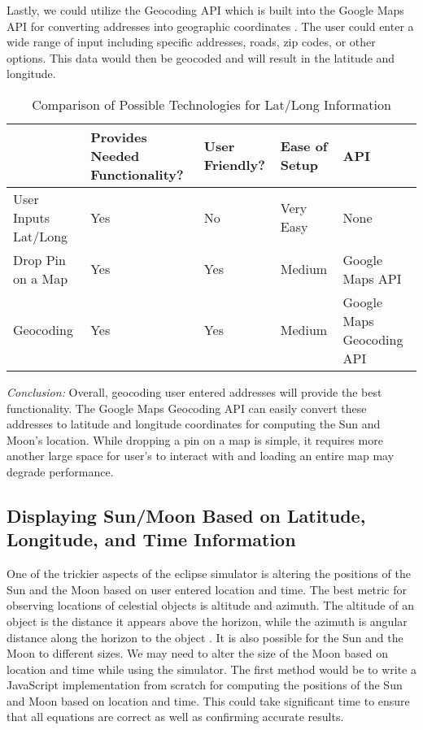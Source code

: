 \documentclass[10pt, onecolumn, draftclsnofoot, letterpaper, compsoc]{IEEEtran}
\begin{document}
Lastly, we could utilize the Geocoding API which is built into the Google Maps
API for converting addresses into geographic coordinates \cite{jsGEO}.
The user could enter a wide range of input including specific addresses,
roads, zip codes, or other options. This data would then be geocoded and will
result in the latitude and longitude.

\begin{table}[h]
\centering
\caption{Comparison of Possible Technologies for Lat/Long Information}
\begin{tabular}{|p{3.15cm}|p{3.15cm}|p{3.15cm}|p{3.15cm}|p{3.15cm}|}
\cline{5-4}

\hline  & Provides Needed Functionality? & User Friendly? & Ease of Setup
 & API \\ \hline

User Inputs Lat/Long & Yes & No & Very Easy & None \\ \hline

Drop Pin on a Map & Yes & Yes & Medium & Google Maps API \\ \hline

Geocoding & Yes & Yes & Medium & Google Maps Geocoding API \\ \hline

\end{tabular}
\label{table:Jake2}
\end{table}

\textit{Conclusion:} Overall, geocoding user entered addresses will provide the
best functionality. The Google Maps Geocoding API can easily convert these
addresses to latitude and longitude coordinates for computing the Sun and
Moon's location. While dropping a pin on a map is simple, it requires more
another large space for user’s to interact with and loading an entire
map may degrade performance.

\subsection{Displaying Sun/Moon Based on Latitude, Longitude, and Time
 Information}

One of the trickier aspects of the eclipse simulator is altering the positions
of the Sun and the Moon based on user entered location and time. The best metric
for observing locations of celestial objects is altitude and azimuth. The
altitude of an object is the distance it appears above the horizon, while the
azimuth is angular distance along the horizon to the object \cite{ALTAZI}.
It is also possible for the Sun and the Moon to different sizes. We may need
to alter the size of the Moon based on location and time while using the
simulator. The first method would be to write a JavaScript implementation
from scratch for computing the positions of the Sun and Moon based on
location and time. This could take significant time to ensure that all
equations are correct as well as confirming accurate results.
\end{document}
